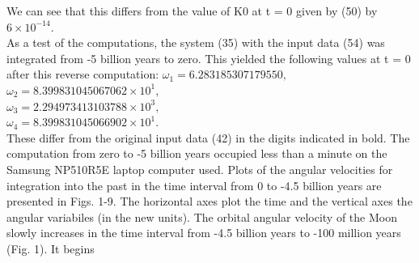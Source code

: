 \documentclass[fontsize = 11pt,a4paper]{article}
\begin{document}
\begin{multicols}{2}
We can see that this differs from the value of K0 at
t = 0 given by (50) by $6 \times {10}^{-14}.$ \\
\indent As a test of the computations, the system (35) with
the input data (54) was integrated from -5 billion
years to zero. This yielded the following values at
t = 0 after this reverse computation:
$\omega_1 = 6.283185307179550,$\\
$\omega_2 = 8.399831045067062 \times 10^1,$\\
$\omega_3 = 2.294973413103788 \times 10^3,$\\
$\omega_4 = 8.399831045066902 \times 10^1.$\\
These differ from the original input data (42) in the
digits indicated in bold. The computation from zero
to -5 billion years occupied less than a minute on the
Samsung NP510R5E laptop computer used.
\indent Plots of the angular velocities for integration into
the past in the time interval from 0 to -4.5 billion
years are presented in Figs. 1-9. The horizontal
axes plot the time and the vertical axes the angular
variabiles (in the new units).
The orbital angular velocity of the Moon slowly
increases in the time interval from -4.5 billion
years to -100 million years (Fig. 1). It begins
\end{multicols}
\pagebreak
\end{document}
